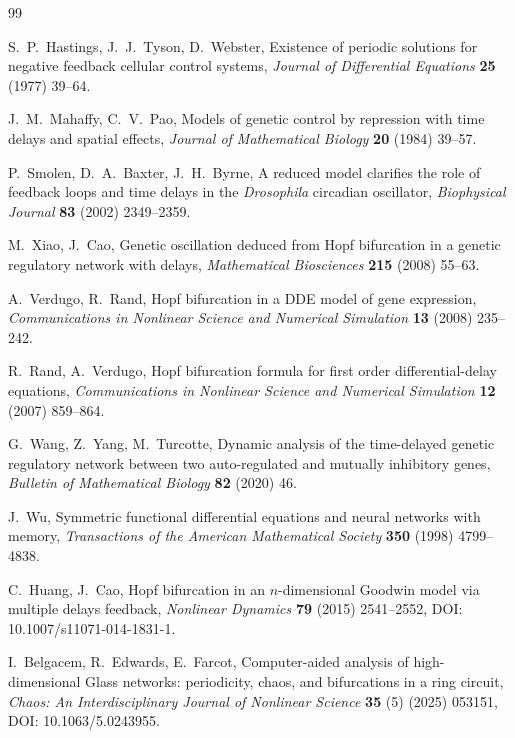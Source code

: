\documentclass[sn-mathphys,Numbered]{sn-jnl}
\theoremstyle{thmstyleone}
\theoremstyle{thmstyletwo}
\theoremstyle{thmstylethree}
\begin{document}
\begin{thebibliography}{99}

S.~P.~Hastings, J.~J.~Tyson, D.~Webster,
Existence of periodic solutions for negative feedback cellular control
systems,
\emph{Journal of Differential Equations} \textbf{25} (1977) 39--64.

J.~M.~Mahaffy, C.~V.~Pao,
Models of genetic control by repression with time delays and spatial
effects,
\emph{Journal of Mathematical Biology} \textbf{20} (1984) 39--57.

P.~Smolen, D.~A.~Baxter, J.~H.~Byrne,
A reduced model clarifies the role of feedback loops and time delays in
the \emph{Drosophila} circadian oscillator,
\emph{Biophysical Journal} \textbf{83} (2002) 2349--2359.

M.~Xiao, J.~Cao,
Genetic oscillation deduced from Hopf bifurcation in a genetic
regulatory network with delays,
\emph{Mathematical Biosciences} \textbf{215} (2008) 55--63.

A.~Verdugo, R.~Rand,
Hopf bifurcation in a DDE model of gene expression,
\emph{Communications in Nonlinear Science and Numerical Simulation}
\textbf{13} (2008) 235--242.

R.~Rand, A.~Verdugo,
Hopf bifurcation formula for first order differential-delay equations,
\emph{Communications in Nonlinear Science and Numerical Simulation}
\textbf{12} (2007) 859--864.

G.~Wang, Z.~Yang, M.~Turcotte,
Dynamic analysis of the time-delayed genetic regulatory network between
two auto-regulated and mutually inhibitory genes,
\emph{Bulletin of Mathematical Biology} \textbf{82} (2020) 46.

J.~Wu,
Symmetric functional differential equations and neural networks with
memory,
\emph{Transactions of the American Mathematical Society} \textbf{350}
(1998) 4799--4838.

C.~Huang, J.~Cao,
Hopf bifurcation in an $n$-dimensional Goodwin model via multiple delays
feedback,
\emph{Nonlinear Dynamics} \textbf{79} (2015) 2541--2552,
DOI: 10.1007/s11071-014-1831-1.

I.~Belgacem, R.~Edwards, E.~Farcot,
Computer-aided analysis of high-dimensional Glass networks: periodicity,
chaos, and bifurcations in a ring circuit,
\emph{Chaos: An Interdisciplinary Journal of Nonlinear Science}
\textbf{35} (5) (2025) 053151, DOI: 10.1063/5.0243955.


\end{thebibliography}
\end{document}
